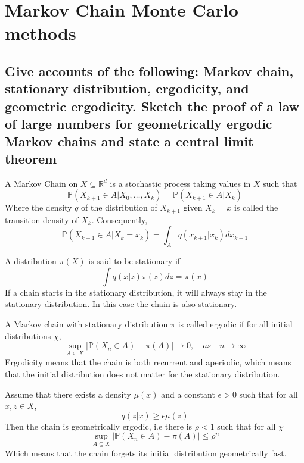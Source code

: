 \documentclass[a4paper]{article}
\begin{document}
\newpage

\section{Markov Chain Monte Carlo methods}

\subsection[Markov Chains]{Give accounts of the following: Markov chain, stationary distribution, ergodicity, and geometric ergodicity. Sketch the proof of a law of large numbers for geometrically ergodic Markov
chains and state a central limit theorem}

A Markov Chain on $X \subseteq \mathbb{R}^d$ is a stochastic process taking values in $X$ such that
\begin{equation}
    \mathbb{P}(X_{k+1} \in A | X_0, \dots, X_k) = \mathbb{P}(X_{k+1} \in A | X_k)
\end{equation}
Where the density $q$ of the distribution of $X_{k+1}$ given $X_k = x$ is called the transition density of $X_k$. Consequently,
\begin{equation}
    \mathbb{P}(X_{k+1} \in A | X_k = x_k) = \int_Aq(x_{k+1}|x_k)dx_{k+1}
\end{equation}

A distribution $\pi(X)$ is said to be stationary if 
\begin{equation}
    \int q(x|z)\pi(z)dz = \pi(x)
\end{equation}
If a chain starts in the stationary distribution, it will always stay in the stationary distribution. In this case the chain is also stationary.

A Markov chain with stationary distribution $\pi$ is called ergodic if for all initial distributions $\chi$,
\begin{equation}
    \sup_{A\subseteq X}|\mathbb{P}(X_n \in A) - \pi(A)| \rightarrow 0, \quad as \quad n \rightarrow \infty
\end{equation}
Ergodicity means that the chain is both recurrent and aperiodic, which means that the initial distribution does not matter for the stationary distribution.

Assume that there exists a density $\mu(x)$ and a constant $\epsilon > 0$ such that for all $x,z \in X$,
\begin{equation}
    q(z|x) \geq \epsilon\mu(z)
\end{equation}
Then the chain is geometrically ergodic, i.e there is $\rho < 1$ such that for all $\chi$
\begin{equation}
    \sup_{A\subseteq X}|\mathbb{P}(X_n \in A) - \pi(A)| \leq \rho^n
\end{equation}
Which means that the chain forgets its initial distribution geometrically fast.
\end{document}
